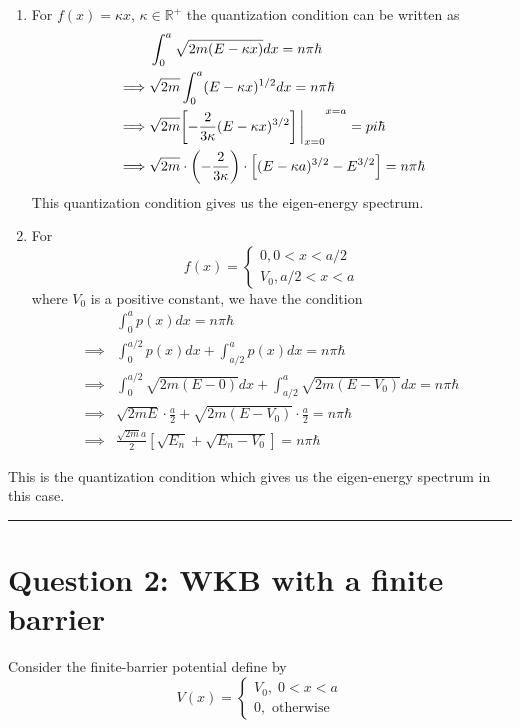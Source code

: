 \documentclass{article}
\newcommand{\R}{\mathbb{R}}
\newcommand{\restr}[2]{{%
  \left.\kern-\nulldelimiterspace %
  #1 %
  \vphantom{\big|} %
  \right|_{#2} %
  }}
\begin{document}
\begin{enumerate}[label=(\alph*)]
  \item For $f(x) = \kappa x$, $\kappa \in \R^+$ the quantization condition can be written as 
  \begin{align*}
    &\int_{0}^{a} \sqrt{2m(E - \kappa x)} dx = n \pi \hbar \\
    \implies& \sqrt{2m}\int_{0}^{a} (E - \kappa x)^{1/2} dx = n \pi \hbar \\
    \implies& \sqrt{2m} \restr{\left[ -\frac{2}{3\kappa}(E - \kappa x)^{3/2} \right]}{x=0}^{x=a} = pi \hbar \\
    \implies& \sqrt{2m} \cdot \left(-\frac{2}{3\kappa}\right) \cdot \left[ (E-\kappa a)^{3/2} - E^{3/2} \right] = n\pi \hbar
  \end{align*}
  This quantization condition gives us the eigen-energy spectrum.

  \vskip 0.5cm
  \item For \[ f(x) = \begin{cases}
    0 , 0 < x < a/2 \\
    V_0, a/2 < x < a
  \end{cases} \]
  where $V_0$ is a positive constant, we have the condition
  \begin{align*}
    &\int_{0}^a p(x)dx = n \pi \hbar \\
    \implies& \int_{0}^{a/2} p(x) dx + \int_{a/2}^a p(x) dx = n \pi\hbar \\
    \implies& \int_0^{a/2} \sqrt{2m(E - 0)} dx + \int_{a/2}^a \sqrt{2m(E - V_0)} dx = n \pi \hbar \\
    \implies& \sqrt{2mE} \cdot \frac{a}{2} + \sqrt{2m(E - V_0)} \cdot \frac{a}{2} = n \pi \hbar \\
    \implies& \frac{\sqrt{2m} a}{2} \left[\sqrt{E_n} + \sqrt{E_n - V_0}\right] = n \pi \hbar
  \end{align*}
\end{enumerate}
This is the quantization condition which gives us the eigen-energy spectrum in this case.

\vskip 0.5cm 
\hrule 
\vskip 0.5cm


\section*{Question 2: WKB with a finite barrier} 

Consider the finite-barrier potential define by 
\[ V(x) = \begin{cases}
  V_0, \;0 < x < a \\
  0, \text{ otherwise}
\end{cases} \]
\end{document}

